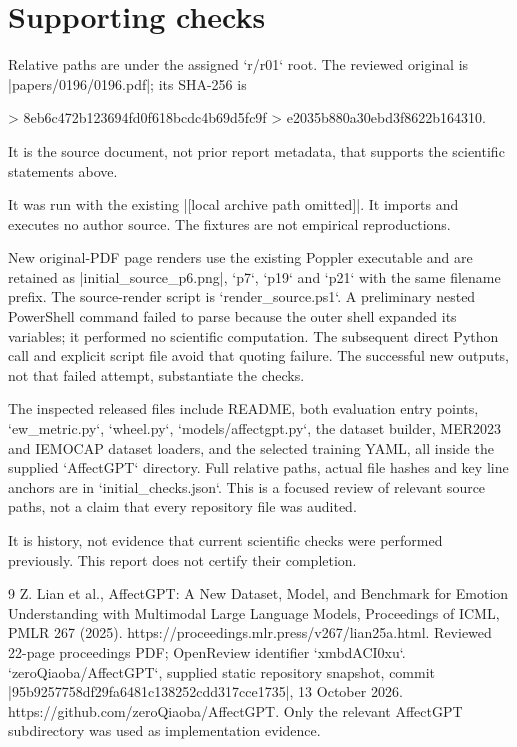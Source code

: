 \documentclass[10pt]{article}
\begin{document}
\section*{Supporting checks}
Relative paths are under the assigned `r/r01` root. The reviewed original is |papers/0196/0196.pdf|; its SHA-256 is\par
> 8eb6c472b123694fd0f618bcdc4b69d5fc9f
> e2035b880a30ebd3f8622b164310.\par
It is the source document, not prior report metadata, that supports the scientific statements above.\par
It was run with the existing |[local archive path omitted]|. It imports and executes no author source. The fixtures are not empirical reproductions.\par
New original-PDF page renders use the existing Poppler executable and are retained as |initial\_source\_p6.png|, `p7`, `p19` and `p21` with the same filename prefix. The source-render script is `render\_source.ps1`. A preliminary nested PowerShell command failed to parse because the outer shell expanded its variables; it performed no scientific computation. The subsequent direct Python call and explicit script file avoid that quoting failure. The successful new outputs, not that failed attempt, substantiate the checks.\par
The inspected released files include README, both evaluation entry points, `ew\_metric.py`, `wheel.py`, `models/affectgpt.py`, the dataset builder, MER2023 and IEMOCAP dataset loaders, and the selected training YAML, all inside the supplied `AffectGPT` directory. Full relative paths, actual file hashes and key line anchors are in `initial\_checks.json`. This is a focused review of relevant source paths, not a claim that every repository file was audited.\par
It is history, not evidence that current scientific checks were performed previously. This report does not certify their completion.\par
9 Z. Lian et al., AffectGPT: A New Dataset, Model, and Benchmark for Emotion Understanding with Multimodal Large Language Models, Proceedings of ICML, PMLR 267 (2025). https://proceedings.mlr.press/v267/lian25a.html. Reviewed 22-page proceedings PDF; OpenReview identifier `xmbdACI0xu`. `zeroQiaoba/AffectGPT`, supplied static repository snapshot, commit |95b9257758df29fa6481c138252cdd317cce1735|, 13 October 2026. https://github.com/zeroQiaoba/AffectGPT. Only the relevant AffectGPT subdirectory was used as implementation evidence.\par
\end{document}
